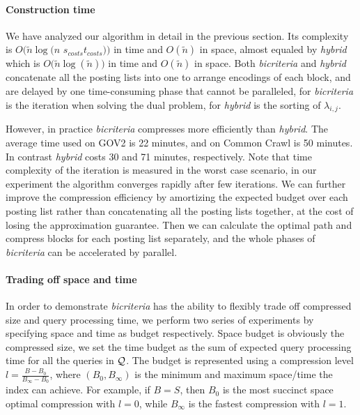 \documentclass{sig-alternate-05-2015}
\begin{document}
\paragraph*{Construction time}
We have analyzed our algorithm in detail in the previous section.
Its complexity is $ O(\tilde{n} $$ \log(n $ $ s_{costs} $$ t_{costs})) $ in time and $ O(\tilde{n}) $ in space, almost equaled by \textit{hybrid} which is $ O(\tilde{n} $$ \log(\tilde{n})) $ in time and $ O(\tilde{n}) $ in space.
Both \textit{bicriteria} and \textit{hybrid} concatenate all the posting lists into one to arrange encodings of each block, and are delayed by one time-consuming phase that cannot be paralleled, for \textit{bicriteria} is the iteration when solving the dual problem, for \textit{hybrid} is the sorting of $ \lambda_{i,j} $.

However, in practice \textit{bicriteria} compresses more efficiently than \textit{hybrid}.
The average time used on GOV2 is 22 minutes, and on Common Crawl is 50 minutes.
In contrast \textit{hybrid} costs 30 and 71 minutes, respectively.
Note that time complexity of the iteration is measured in the worst case scenario, in our experiment the algorithm converges rapidly after few iterations.
We can further improve the compression efficiency by amortizing the expected budget over each posting list rather than concatenating all the posting lists together, at the cost of losing the approximation guarantee.
Then we can calculate the optimal path and compress blocks for each posting list separately, and the whole phases of \textit{bicriteria} can be accelerated by parallel.

\paragraph*{Trading off space and time}
In order to demonstrate \textit{bicriteria} has the ability to flexibly trade off compressed size and query processing time, we perform two series of experiments by specifying space and time as budget respectively.
Space budget is obviously the compressed size, we set the time budget as the sum of expected query processing time for all the queries in $ \cal Q $.
The budget is represented using a compression level $ l = \frac{B-B_0}{B_\infty-B_0} $, where $ (B_0,B_\infty) $ is the minimum and maximum space/time the index can achieve.
For example, if $ B = S $, then $ B_0 $ is the most succinct space optimal compression with $ l = 0 $, while $ B_\infty $ is the fastest compression with $ l = 1 $.
\end{document}
